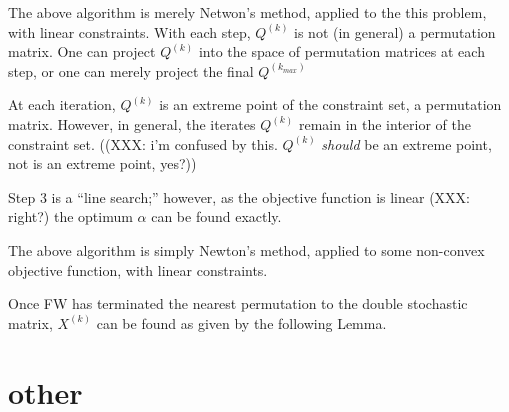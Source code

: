 The above algorithm is merely Netwon's method, applied to the this problem, with linear constraints.  With each step, $Q^{(k)}$ is not (in general) a permutation matrix.  One can project $Q^{(k)}$ into the space of permutation matrices at each step, or one can merely project the final $Q^{(k_{max})}$

\begin{Rem}
\item At each iteration, $Q^{(k)}$ is an extreme point of the
constraint set, a permutation matrix.
However, in general, the iterates $Q^{(k)}$ remain in the
interior of the constraint set. ((XXX: i'm confused by this.  $Q^{(k)}$ \emph{should} be an extreme point, not is an extreme point, yes?))
\item Step 3 is a ``line search;'' however, as the objective function is linear (XXX: right?)
the optimum $\alpha$ can be found exactly.
\item The above algorithm is simply Newton's method, applied to some non-convex objective function, with linear constraints.
\item Once FW has terminated the nearest permutation to the double stochastic matrix, $X^{(k)}$ can be found as given by the following Lemma.
\end{Rem}















\section{other} %
\label{sec:other}

